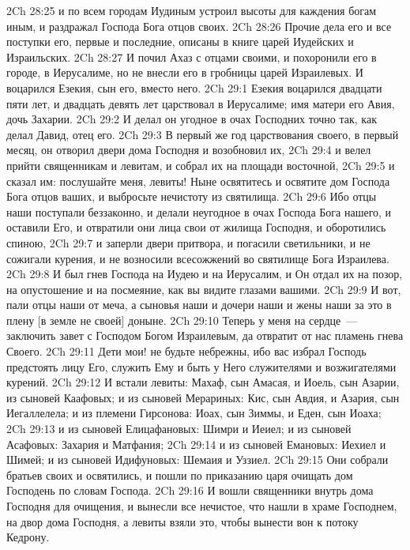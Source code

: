 \vs 2Ch 28:25 и по всем городам Иудиным устроил высоты для каждения богам иным, и раздражал Господа Бога отцов своих.
\rsbpar\vs 2Ch 28:26 Прочие дела его и все поступки его, первые и последние, описаны в книге царей Иудейских и Израильских.
\vs 2Ch 28:27 И почил Ахаз с отцами своими, и похоронили его в городе, в Иерусалиме, но не внесли его в гробницы царей Израилевых. И воцарился Езекия, сын его, вместо него.
\vs 2Ch 29:1 Езекия воцарился двадцати пяти лет, и двадцать девять лет царствовал в Иерусалиме; имя матери его Авия, дочь Захарии.
\vs 2Ch 29:2 И делал он угодное в очах Господних точно так, как делал Давид, отец его.
\rsbpar\vs 2Ch 29:3 В первый же год царствования своего, в первый месяц, он отворил двери дома Господня и возобновил их,
\vs 2Ch 29:4 и велел прийти священникам и левитам, и собрал их на площади восточной,
\vs 2Ch 29:5 и сказал им: послушайте меня, левиты! Ныне освятитесь  и освятите дом Господа Бога отцов ваших, и выбросьте нечистоту из святилища.
\vs 2Ch 29:6 Ибо отцы наши поступали беззаконно, и делали неугодное в очах Господа Бога нашего, и оставили Его, и отвратили они лица свои от жилища Господня, и оборотились спиною,
\vs 2Ch 29:7 и заперли двери притвора, и погасили светильники, и не сожигали курения, и не возносили всесожжений во святилище Бога Израилева.
\vs 2Ch 29:8 И был гнев Господа на Иудею и на Иерусалим, и Он отдал их на позор, на опустошение и на посмеяние, как вы видите глазами вашими.
\vs 2Ch 29:9 И вот, пали отцы наши от меча, а сыновья наши и дочери наши и жены наши за это в плену [в земле не своей] доныне.
\vs 2Ch 29:10 Теперь у меня на сердце~--- заключить завет с Господом Богом Израилевым, да отвратит от нас пламень гнева Своего.
\vs 2Ch 29:11 Дети мои! не будьте небрежны, ибо вас избрал Господь предстоять лицу Его, служить Ему и быть у Него служителями и возжигателями курений.
\vs 2Ch 29:12 И встали левиты: Махаф, сын Амасая, и Иоель, сын Азарии, из сыновей Каафовых; и из сыновей Мерариных: Кис, сын Авдия, и Азария, сын Иегаллелела; и из племени Гирсонова: Иоах, сын Зиммы, и Еден, сын Иоаха;
\vs 2Ch 29:13 и из сыновей Елицафановых: Шимри и Иеиел; и из сыновей Асафовых: Захария и Матфания;
\vs 2Ch 29:14 и из сыновей Емановых: Иехиел и Шимей; и из сыновей Идифуновых: Шемаия и Уззиел.
\vs 2Ch 29:15 Они собрали братьев своих и освятились, и пошли по приказанию царя очищать дом Господень по словам Господа.
\vs 2Ch 29:16 И вошли священники внутрь дома Господня для очищения, и вынесли все нечистое, что нашли в храме Господнем, на двор дома Господня, а левиты взяли это, чтобы вынести вон к потоку Кедрону.
